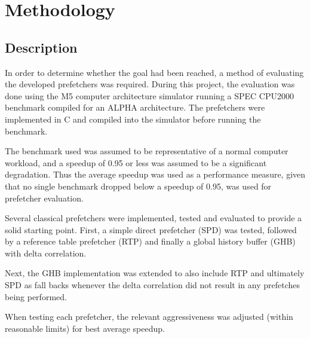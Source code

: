 \section{Methodology}
\label{sec:methodology}
\subsection{Description}

In order to determine whether the goal had been reached, a method of evaluating the developed prefetchers was required.
During this project, the evaluation was done using the M5 computer architecture simulator running a SPEC CPU2000 benchmark compiled for an ALPHA architecture.
The prefetchers were implemented in C and compiled into the simulator before running the benchmark.

The benchmark used was assumed to be representative of a normal computer workload, and a speedup of 0.95 or less was assumed to be a significant degradation.
Thus the average speedup was used as a performance measure, given that no single benchmark dropped below a speedup of 0.95, was used for prefetcher evaluation.

Several classical prefetchers were implemented, tested and evaluated to provide a solid starting point.
First, a simple direct prefetcher (SPD) was tested, followed by a reference table prefetcher (RTP) and finally a global history buffer (GHB) with delta correlation.

Next, the GHB implementation was extended to also include RTP and ultimately SPD as fall backs whenever the delta correlation did not result in any prefetches being performed.

When testing each prefetcher, the relevant aggressiveness was adjusted (within reasonable limits) for best average speedup.
